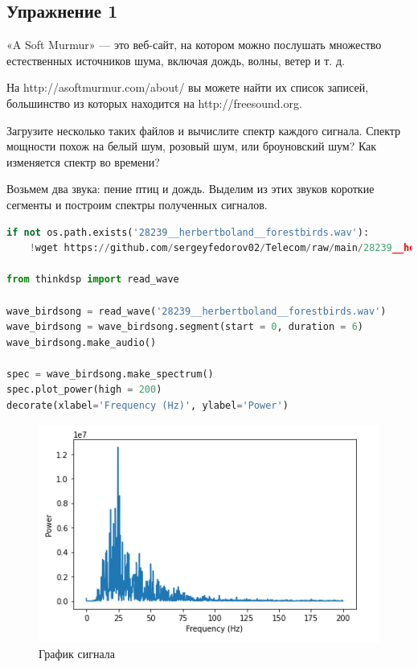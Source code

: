 \subsection{Упражнение 1}

«A Soft Murmur» — это веб-сайт, на котором можно послушать множество естественных источников шума, включая дождь, волны, ветер и т. д. 

\noindent На http://asoftmurmur.com/about/ вы можете найти их список записей, большинство из которых находится на http://freesound.org.

\noindent Загрузите несколько таких файлов и вычислите спектр каждого сигнала. Спектр мощности похож на белый шум, розовый шум, или броуновский шум? Как изменяется спектр во времени?

Возьмем два звука: пение птиц и дождь. Выделим из этих звуков короткие сегменты и построим спектры полученных сигналов.

\begin{lstlisting}[language=Python]
if not os.path.exists('28239__herbertboland__forestbirds.wav'):
    !wget https://github.com/sergeyfedorov02/Telecom/raw/main/28239__herbertboland__forestbirds.wav
    
from thinkdsp import read_wave

wave_birdsong = read_wave('28239__herbertboland__forestbirds.wav')
wave_birdsong = wave_birdsong.segment(start = 0, duration = 6)
wave_birdsong.make_audio()

spec = wave_birdsong.make_spectrum()
spec.plot_power(high = 200)
decorate(xlabel='Frequency (Hz)', ylabel='Power')
\end{lstlisting}

\begin{figure}[H]
	\begin{center}
		\includegraphics[scale=1]{fig/lab04/lab04_01.png}
		\caption{График сигнала}
	\end{center}
\end{figure}

